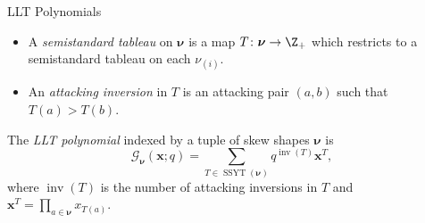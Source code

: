 \documentclass[dvipsnames]{beamer}
\newcommand{\xx}{{\boldsymbol x}}
\newcommand{\Gcal}{{\mathcal G}}
\newcommand{\nubold}{{\boldsymbol \nu }}
\DeclareMathOperator{\inv}{inv}
\DeclareMathOperator{\SSYT}{SSYT}
\theoremstyle{definition}
\begin{document}
\begin{frame}{LLT Polynomials}
  \vspace{-2mm}
\small
\begin{itemize}
\item A \emph{semistandard tableau} on $\nubold  $ is a map
$T\colon \nubold  \rightarrow \Z _{+}$ which restricts to a
semistandard tableau on each $\nu_{(i)}$.
\item An \emph{attacking inversion} in $T$ is
an attacking pair $(a,b)$ such that~$T(a)>T(b)$.
\end{itemize}

The \emph{LLT polynomial} indexed by a tuple of skew shapes $\nubold
$ is
\begin{equation*}
\Gcal_{\nubold  }(\xx;q) = \sum _{T\in \SSYT (\nubold
)}q^{\inv (T)}\xx ^{T},
\end{equation*}
\vspace{-1mm}
where $\inv (T)$ is the number of attacking inversions in $T$ and
$\xx ^{T} = \prod _{a\in \nubold  } x_{T(a)}$.


\end{frame}
\end{document}
